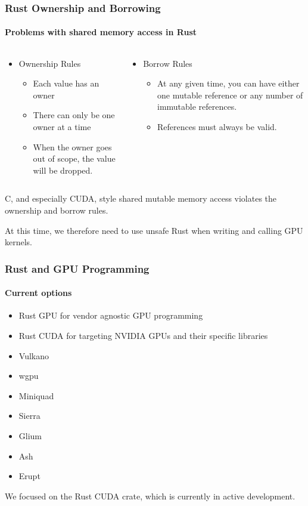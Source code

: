 \documentclass[aspectratio=169]{beamer}
\begin{document}
\begin{frame}
	\frametitle{Rust Ownership and Borrowing}
	\framesubtitle{Problems with shared memory access in Rust}

	\begin{columns}
		\begin{column}{0.5\textwidth}
			\begin{itemize}
				\item Ownership Rules\fnmark
				      \begin{itemize}
					      \item Each value has an owner
					      \item There can only be one owner at a time
					      \item When the owner goes out of scope, the value will be dropped.
				      \end{itemize}
			\end{itemize}
		\end{column}
		\begin{column}{0.5\textwidth}
			\begin{itemize}
				\item Borrow Rules\fnmark
				      \begin{itemize}
					      \item At any given time, you can have either one mutable reference or any number of immutable references.
					      \item References must always be valid.
				      \end{itemize}
			\end{itemize}
		\end{column}
	\end{columns}

	\vspace{1cm}
	C, and especially CUDA, style shared mutable memory access violates the ownership and borrow rules.

	At this time, we therefore need to use unsafe Rust when writing and calling GPU kernels.

\end{frame}

\begin{frame}
	\frametitle{Rust and GPU Programming}
	\framesubtitle{Current options}

	\begin{itemize}
		\item Rust GPU for vendor agnostic GPU programming
		\item Rust CUDA for targeting NVIDIA GPUs and their specific libraries
		\item Vulkano
		\item wgpu
		\item Miniquad
		\item Sierra
		\item Glium
		\item Ash
		\item Erupt
	\end{itemize}

	We focused on the Rust CUDA crate, which is currently in active development.
\end{frame}
\end{document}
